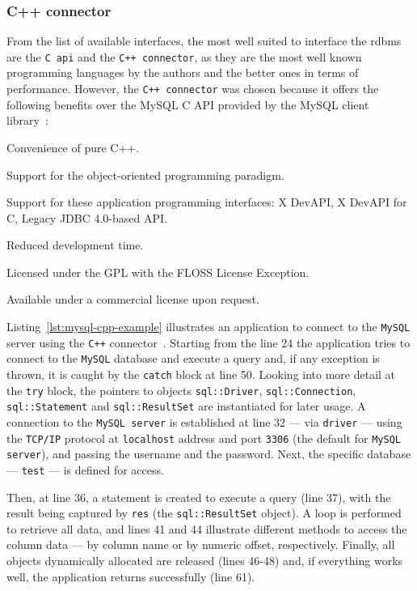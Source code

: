 \subsubsection{C++ connector}
\label{sec:c++-connector}
From the list of available interfaces, the most well suited to interface the
\gls{rdbms} are the \texttt{C \gls{api}} and the \texttt{C++ connector}, as they
are the most well known programming languages by the authors and the better ones
in terms of performance.
However, the \texttt{C++ connector} was chosen because it offers the following
benefits over the MySQL C API provided by the MySQL client library~\cite{MysqlConnC++Intro}:
\begin{item-c}
\item Convenience of pure C++.
\item Support for the object-oriented programming paradigm.
\item Support for these application programming interfaces: X DevAPI, X DevAPI
  for C, Legacy JDBC 4.0-based API.
\item Reduced development time.
\item Licensed under the GPL with the FLOSS License Exception.
\item Available under a commercial license upon request.
\end{item-c}

Listing~\ref{lst:mysql-cpp-example} illustrates an application to connect
to the \texttt{MySQL} server using the \texttt{C++} connector~\cite{MysqlConnC++Example1}. Starting from the
line 24 the application tries to connect to the \texttt{MySQL} database and
execute a query and, if any exception is thrown, it is caught by the
\texttt{catch} block at line 50.
Looking into more detail at the \texttt{try} block, the pointers to objects \texttt{sql::Driver},
\texttt{sql::Connection}, \texttt{sql::Statement} and \texttt{sql::ResultSet}
are instantiated for later usage. A connection to the \texttt{MySQL server} is
established  at line 32 --- via \texttt{driver} --- using the \texttt{TCP/IP}
protocol at \texttt{localhost} address and port \texttt{3306} (the default for \texttt{MySQL server}), and passing the
username and the password. Next, the specific database --- \texttt{test} --- is
defined for access.

Then, at line 36, a statement is created to execute a query (line 37), with the
result being captured by \texttt{res} (the \texttt{sql::ResultSet} object). A
loop is performed to retrieve all data, and lines 41 and 44 illustrate different
methods to access the column data --- by column name or by numeric offset,
respectively. Finally, all objects dynamically allocated are released (lines
46-48) and, if everything works well, the application returns successfully (line
61).
%



